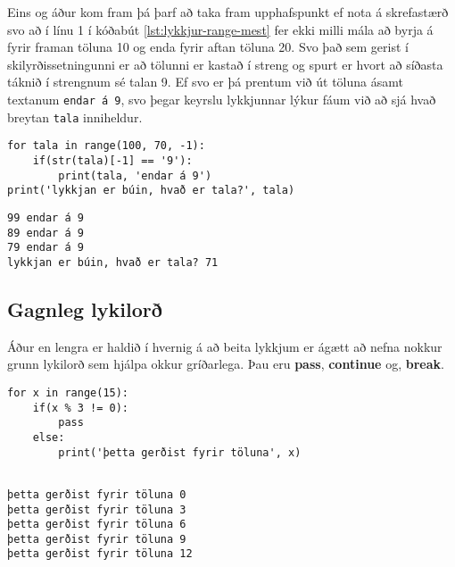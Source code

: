 Eins og áður kom fram þá þarf að taka fram upphafspunkt ef nota á skrefastærð svo að í línu 1 í kóðabút \ref{lst:lykkjur-range-mest} fer ekki milli mála að byrja á fyrir framan töluna 10 og enda fyrir aftan töluna 20.
Svo það sem gerist í skilyrðissetningunni er að tölunni er kastað í streng og spurt er hvort að síðasta táknið í strengnum sé talan 9.
Ef svo er þá prentum við út töluna ásamt textanum \texttt{endar á 9}, svo þegar keyrslu lykkjunnar lýkur fáum við að sjá hvað breytan \texttt{tala} inniheldur.


\lstset{style=venjulegt}
\begin{lstlisting}[caption=for lykkja range() fallið notað til að telja aftur á bak, label=lst:lykkjur-range-mest]
for tala in range(100, 70, -1):
	if(str(tala)[-1] == '9'):
		print(tala, 'endar á 9')
print('lykkjan er búin, hvað er tala?', tala)
\end{lstlisting}

\lstset{style=uttak}
\begin{lstlisting}
99 endar á 9
89 endar á 9
79 endar á 9
lykkjan er búin, hvað er tala? 71
\end{lstlisting}
\lstset{style=venjulegt}

\subsection{Gagnleg lykilorð}\label{uk:lykkjulykilorð}
	Áður en lengra er haldið í hvernig á að beita lykkjum er ágætt að nefna nokkur grunn lykilorð sem hjálpa okkur gríðarlega.
	Þau eru \textbf{pass}, \textbf{continue} og, \textbf{break}.

\lstset{style=venjulegt}
\begin{lstlisting}[caption=Lykilorðið pass notað með for lykkju, label=lst:lykkjur-for-pass]
for x in range(15):
	if(x % 3 != 0):
		pass
	else:
		print('þetta gerðist fyrir töluna', x)
		
\end{lstlisting}
\lstset{style=uttak}
\begin{lstlisting}
þetta gerðist fyrir töluna 0
þetta gerðist fyrir töluna 3
þetta gerðist fyrir töluna 6
þetta gerðist fyrir töluna 9
þetta gerðist fyrir töluna 12
\end{lstlisting}


